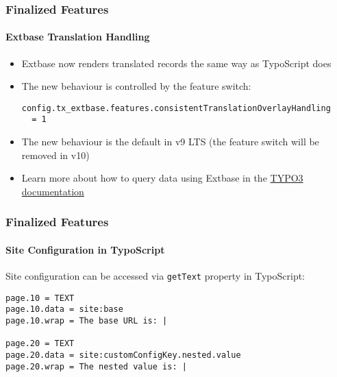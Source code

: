 \begin{frame}[fragile]
	\frametitle{Finalized Features}
	\framesubtitle{Extbase Translation Handling}

	\lstset{basicstyle=\footnotesize\ttfamily}

	\begin{itemize}
		\item Extbase now renders translated records the same way as TypoScript
			does
		\item The new behaviour is controlled by the feature switch:

\begin{lstlisting}
config.tx_extbase.features.consistentTranslationOverlayHandling
  = 1
\end{lstlisting}

		\item The new behaviour is the default in v9 LTS (the feature switch
			will be removed in v10)
		\item Learn more about how to query data using Extbase in the
			\href{https://github.com/TYPO3/TYPO3.CMS/blob/master/typo3/sysext/core/Documentation/Changelog/9.5/Important-82363-MakeExtBaseTranslationHandlingConsistentWithTyposcript.rst}{TYPO3 documentation}

	\end{itemize}

\end{frame}


\begin{frame}[fragile]
	\frametitle{Finalized Features}
	\framesubtitle{Site Configuration in TypoScript}

	\lstset{basicstyle=\smaller\ttfamily}

	Site configuration can be accessed via \texttt{getText} property in
	TypoScript:

\begin{lstlisting}
page.10 = TEXT
page.10.data = site:base
page.10.wrap = The base URL is: |

page.20 = TEXT
page.20.data = site:customConfigKey.nested.value
page.20.wrap = The nested value is: |
\end{lstlisting}

\end{frame}

